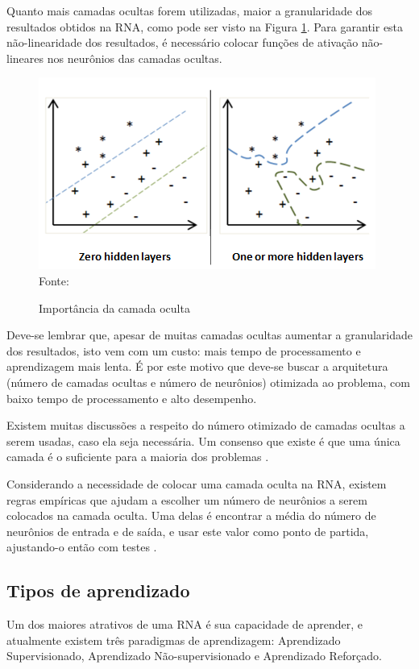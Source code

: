 \documentclass[
	12pt,					%
	openright,				%
	oneside,				%
	a4paper,				%
	bibjustif,				%
	chapter=TITLE,			%
	english,				%
	brazil,					%
	]{abntex2}
\newcommand{\source}[1]{\small Fonte: {#1}}
\begin{document}
	Quanto mais camadas ocultas forem utilizadas,
	maior a granularidade dos resultados obtidos na RNA,
	como pode ser visto na Figura \ref{fig:nnhiddenlayer}.
	Para garantir esta não-linearidade dos resultados, %
	é necessário colocar funções de ativação não-lineares nos neurônios das camadas ocultas.
	
	\begin{figure}[ht!]
		\caption{Importância da camada oculta}
		\centering
		\includegraphics[scale=1.5]{img/HiddenLayers.png}\\
		\vspace{0.5mm}
		\source{}
		\label{fig:nnhiddenlayer}
	\end{figure}
	
	Deve-se lembrar que, apesar de muitas camadas ocultas aumentar a granularidade dos resultados,
	isto vem com um custo:
	mais tempo de processamento e
	aprendizagem mais lenta.
	É por este motivo que deve-se buscar a arquitetura (número de camadas ocultas e número de neurônios) otimizada ao problema,
	com baixo tempo de processamento e alto desempenho.
	
	Existem muitas discussões a respeito do número otimizado de camadas ocultas a serem usadas, caso ela seja necessária.
	Um consenso que existe é que uma única camada é o suficiente para a maioria dos problemas
	\cite{stackExchange1}.
	
	Considerando a necessidade de colocar uma camada oculta na RNA,
	existem regras empíricas que ajudam a escolher um número de neurônios a serem colocados na camada oculta.
	Uma delas é encontrar a média do número de neurônios de entrada e de saída,
	e usar este valor como ponto de partida,
	ajustando-o então com testes
	\cite{stackExchange1}.
	
	\subsection{Tipos de aprendizado}
	Um dos maiores atrativos de uma RNA é sua capacidade de aprender,
	e atualmente existem três paradigmas de aprendizagem:
	Aprendizado Supervisionado, Aprendizado Não-supervisionado e Aprendizado Reforçado.
	
\end{document}
